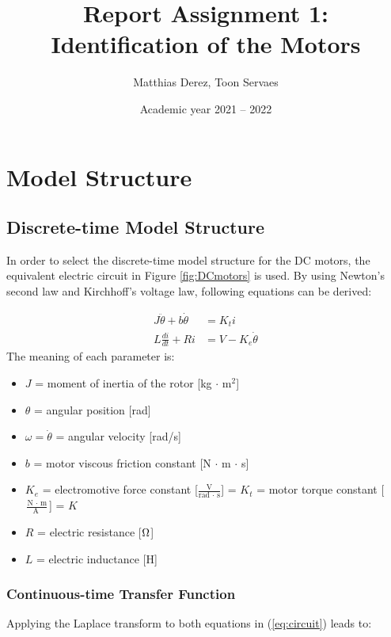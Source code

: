 \documentclass[a4paper,kul]{kulakarticle} %
\date{Academic year 2021 -- 2022}
\title{Report Assignment 1: Identification of the Motors}
\author{Matthias Derez, Toon Servaes}
\begin{document}
\maketitle

\tableofcontents
\listoffigures
\listoftables


\section{Model Structure}
\subsection{Discrete-time Model Structure} 
\label{subsec:complex_model}
In order to select the discrete-time model structure for the DC motors, the equivalent electric circuit in Figure \ref{fig:DCmotors} is used. By using Newton's second law and Kirchhoff's voltage law, following equations can be derived:

\begin{equation}
    \label{eq:circuit}
    \begin{split}
         J\ddot{\theta}  + b\dot{\theta} &= K_{t}i \\
         L\frac{di}{dt} + Ri &= V - K_{e}\dot{\theta}
     \end{split} 
\end{equation}
The meaning of each parameter is:
\begin{itemize}
    \item $J$ = moment of inertia of the rotor [kg $\cdot$ m$^2$]
    \item $\theta$ = angular position [rad]
    \item $\omega = \dot{\theta}$ = angular velocity [rad/s]
    \item $b$ = motor viscous friction constant [N $\cdot$ m $\cdot$ s]
    \item $K_{e}$ = electromotive force constant [$\frac{\text{V}}{\text{rad } \cdot \text{ s}}$] = $K_{t}$ = motor torque constant [$\frac{\text{N } \cdot \text{ m}}{\text{A }}$] = $K$
    \item $R$ = electric resistance [$\ohm$]
    \item $L$ = electric inductance [H]
\end{itemize}

\subsubsection*{Continuous-time Transfer Function}
Applying the Laplace transform to both equations in (\ref{eq:circuit}) leads to:
\end{document}
